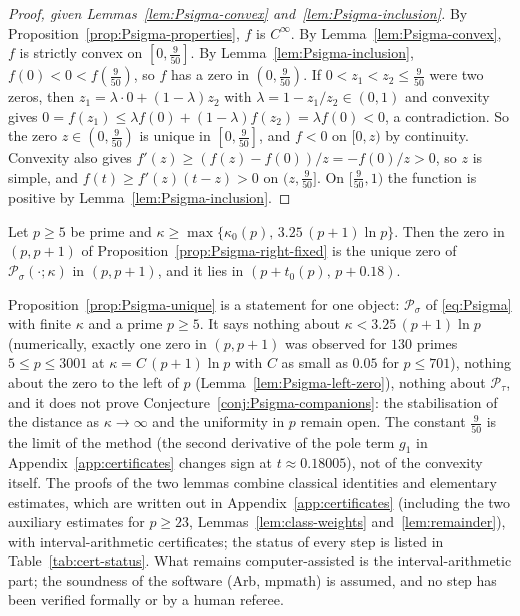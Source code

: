 \begin{proof}[Proof, given Lemmas~\ref{lem:Psigma-convex} and~\ref{lem:Psigma-inclusion}]
By Proposition~\ref{prop:Psigma-properties}, $f$ is $C^\infty$. By Lemma~\ref{lem:Psigma-convex}, $f$ is strictly convex on $[0,\tfrac{9}{50}]$. By Lemma~\ref{lem:Psigma-inclusion}, $f(0)<0<f(\tfrac{9}{50})$, so $f$ has a zero in $(0,\tfrac{9}{50})$. If $0<z_1<z_2\le\tfrac{9}{50}$ were two zeros, then $z_1=\lambda\cdot0+(1-\lambda)z_2$ with $\lambda=1-z_1/z_2\in(0,1)$ and convexity gives $0=f(z_1)\le\lambda f(0)+(1-\lambda)f(z_2)=\lambda f(0)<0$, a contradiction. So the zero $z\in(0,\tfrac{9}{50})$ is unique in $[0,\tfrac{9}{50}]$, and $f<0$ on $[0,z)$ by continuity. Convexity also gives $f'(z)\ge(f(z)-f(0))/z=-f(0)/z>0$, so $z$ is simple, and $f(t)\ge f'(z)(t-z)>0$ on $(z,\tfrac{9}{50}]$. On $[\tfrac{9}{50},1)$ the function is positive by Lemma~\ref{lem:Psigma-inclusion}.
\end{proof}

\begin{corollary}\label{cor:Psigma-unique-fixed}
Let $p\ge5$ be prime and $\kappa\ge\max\{\kappa_0(p),\,3.25\,(p+1)\ln p\}$. Then the zero in $(p,p+1)$ of Proposition~\ref{prop:Psigma-right-fixed} is the unique zero of $\mathcal P_\sigma(\cdot;\kappa)$ in $(p,p+1)$, and it lies in $(p+t_0(p),\,p+0.18)$.
\end{corollary}

\begin{remark}\label{rem:right-zero-scope}
Proposition~\ref{prop:Psigma-unique} is a statement for one object: $\mathcal P_\sigma$ of \eqref{eq:Psigma} with finite $\kappa$ and a prime $p\ge5$. It says nothing about $\kappa<3.25\,(p+1)\ln p$ (numerically, exactly one zero in $(p,p+1)$ was observed for $130$ primes $5\le p\le3001$ at $\kappa=C\,(p+1)\ln p$ with $C$ as small as $0.05$ for $p\le701$), nothing about the zero to the left of $p$ (Lemma~\ref{lem:Psigma-left-zero}), nothing about $\mathcal P_\tau$, and it does not prove Conjecture~\ref{conj:Psigma-companions}: the stabilisation of the distance as $\kappa\to\infty$ and the uniformity in $p$ remain open. The constant $\tfrac{9}{50}$ is the limit of the method (the second derivative of the pole term $g_1$ in Appendix~\ref{app:certificates} changes sign at $t\approx0.18005$), not of the convexity itself. The proofs of the two lemmas combine classical identities and elementary estimates, which are written out in Appendix~\ref{app:certificates} (including the two auxiliary estimates for $p\ge23$, Lemmas~\ref{lem:class-weights} and~\ref{lem:remainder}), with interval-arithmetic certificates; the status of every step is listed in Table~\ref{tab:cert-status}. What remains computer-assisted is the interval-arithmetic part; the soundness of the software (Arb, mpmath) is assumed, and no step has been verified formally or by a human referee.
\end{remark}
